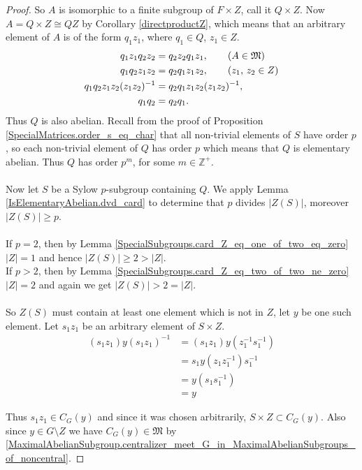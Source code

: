 \begin{proof}
  So $A$ is isomorphic to a finite subgroup of $F \times Z$, call it $Q \times Z$. Now $A = Q \times Z \cong QZ$ by Corollary \ref{directproductZ}, which means that an arbitrary element of $A$ is of the form $q_1z_1$, where $q_1 \in Q$, $z_1 \in Z$.
  \begin{align*} q_1z_1q_2z_2 &= q_2z_2 q_1z_1, \tag{$A \in \mathfrak{M}$}
  \\ q_1q_2z_1z_2 &= q_2q_1z_1z_2, \tag{$z_1$, $z_2 \in Z$}
  \\  q_1q_2z_1z_2(z_1z_2)^{-1} &= q_2q_1z_1z_2(z_1z_2)^{-1},
  \\ q_1q_2 &= q_2q_1.
  \end{align*}
  Thus $Q$ is also abelian. Recall from the proof of Proposition \ref{SpecialMatrices.order_s_eq_char} that all non-trivial elements of $S$ have order $p$, so each non-trivial element of $Q$ has order $p$ which means that $Q$ is elementary abelian. Thus $Q$ has order $p^m$, for some $m \in \mathbb{Z}^+$. \\
  \\
  Now let $S$ be a Sylow $p$-subgroup containing $Q$. We apply Lemma \ref{IsElementaryAbelian.dvd_card} to determine that $p$ divides $|Z(S)|$, moreover $|Z(S)| \geq p$. \\
  \\
  If $p=2$, then by Lemma \ref{SpecialSubgroups.card_Z_eq_one_of_two_eq_zero} $|Z| = 1$ and hence $|Z(S)| \geq 2 > |Z|$.\\
  If $p > 2$, then by Lemma \ref{SpecialSubgroups.card_Z_eq_two_of_two_ne_zero} $|Z| = 2$ and again we get $|Z(S)| > 2 = |Z|$. \\
  \\
  So $Z(S)$ must contain at least one element which is not in $Z$, let $y$ be one such element. Let $s_1z_1$ be an arbitrary element of $S \times Z$.
  \begin{align*}
  (s_1z_1)y(s_1z_1)^{-1} &= (s_1z_1)y(z_1^{-1}s_1^{-1})
  \\ &= s_1y(z_1z_1^{-1})s_1^{-1} \tag{since $y \in L$, $z_1 \in Z$}
  \\ &= y(s_1s_1^{-1}) \tag{since $s_1 \in S$, $y \in Z(S)$}
  \\ &= y
  \end{align*}
  
  Thus $s_1z_1 \in C_G(y)$ and since it was chosen arbitrarily, $S \times Z \subset C_G(y)$. Also since $y \in G \! \setminus \! Z$ we have $C_G(y) \in \mathfrak{M}$ by \ref{MaximalAbelianSubgroup.centralizer_meet_G_in_MaximalAbelianSubgroups_of_noncentral}.
\end{proof}

